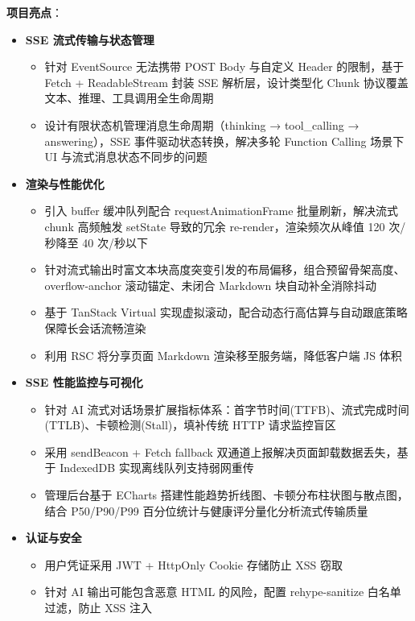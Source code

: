 \documentclass{resume}
\begin{document}
\textbf{项目亮点}：
\begin{itemize}
  \item \textbf{SSE 流式传输与状态管理}
  \begin{itemize}
    \item 针对 EventSource 无法携带 POST Body 与自定义 Header 的限制，基于 Fetch + ReadableStream 封装 SSE 解析层，设计类型化 Chunk 协议覆盖文本、推理、工具调用全生命周期
    \item 设计有限状态机管理消息生命周期（thinking → tool\_calling → answering），SSE 事件驱动状态转换，解决多轮 Function Calling 场景下 UI 与流式消息状态不同步的问题
  \end{itemize}

  \item \textbf{渲染与性能优化}
  \begin{itemize}
    \item 引入 buffer 缓冲队列配合 requestAnimationFrame 批量刷新，解决流式 chunk 高频触发 setState 导致的冗余 re-render，渲染频次从峰值 120 次/秒降至 40 次/秒以下
    \item 针对流式输出时富文本块高度突变引发的布局偏移，组合预留骨架高度、overflow-anchor 滚动锚定、未闭合 Markdown 块自动补全消除抖动
    \item 基于 TanStack Virtual 实现虚拟滚动，配合动态行高估算与自动跟底策略保障长会话流畅渲染
    \item 利用 RSC 将分享页面 Markdown 渲染移至服务端，降低客户端 JS 体积
  \end{itemize}

  \item \textbf{SSE 性能监控与可视化}
  \begin{itemize}
    \item 针对 AI 流式对话场景扩展指标体系：首字节时间(TTFB)、流式完成时间(TTLB)、卡顿检测(Stall)，填补传统 HTTP 请求监控盲区
    \item 采用 sendBeacon + Fetch fallback 双通道上报解决页面卸载数据丢失，基于 IndexedDB 实现离线队列支持弱网重传
    \item 管理后台基于 ECharts 搭建性能趋势折线图、卡顿分布柱状图与散点图，结合 P50/P90/P99 百分位统计与健康评分量化分析流式传输质量
  \end{itemize}

  \item \textbf{认证与安全}
  \begin{itemize}
    \item 用户凭证采用 JWT + HttpOnly Cookie 存储防止 XSS 窃取
    \item 针对 AI 输出可能包含恶意 HTML 的风险，配置 rehype-sanitize 白名单过滤，防止 XSS 注入
  \end{itemize}
\end{itemize}
\end{document}

